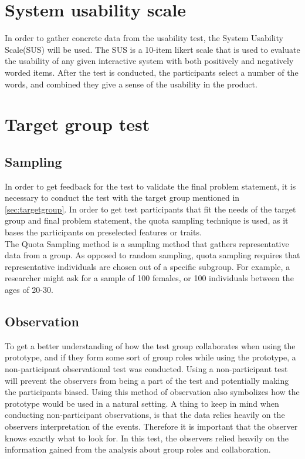 \section{System usability scale}\label{sus}
In order to gather concrete data from the usability test, the System Usability Scale(SUS)\cite{susScale} will be used. The SUS is a 10-item likert scale that is used to evaluate the usability of any given interactive system with both positively and negatively worded items. After the test is conducted, the participants select a number of the words, and combined they give a sense of the usability in the product\cite{susScale}.

\section{Target group test}

\subsection{Sampling}
In order to get feedback for the test to validate the final problem statement, it is necessary to conduct the test with the target group mentioned in \autoref{sec:targetgroup}. In order to get test participants that fit the needs of the target group and final problem statement, the quota sampling technique is used, as it bases the participants on preselected features or traits.\\

The Quota Sampling method is a sampling method that gathers representative data from a group.\cite{quotaSamp} As opposed to random sampling, quota sampling requires that representative individuals are chosen out of a specific subgroup\cite{quotaSamp}. For example, a researcher might ask for a sample of 100 females, or 100 individuals between the ages of 20-30\cite{quotaSamp}.

\subsection{Observation}\label{sec:observationalTest}
To get a better understanding of how the test group collaborates when using the prototype, and if they form some sort of group roles while using the prototype, a non-participant observational test was conducted\cite[p.~64-67]{bjoernerBog}. Using a non-participant test will prevent the observers from being a part of the test and potentially making the participants biased. Using this method of observation also symbolizes how the prototype would be used in a natural setting. A thing to keep in mind when conducting non-participant observations, is that the data relies heavily on the observers interpretation of the events. Therefore it is important that the observer knows exactly what to look for. In this test, the observers relied heavily on the information gained from the analysis about group roles and collaboration\cite[p.~64-67]{bjoernerBog}.\\\\

